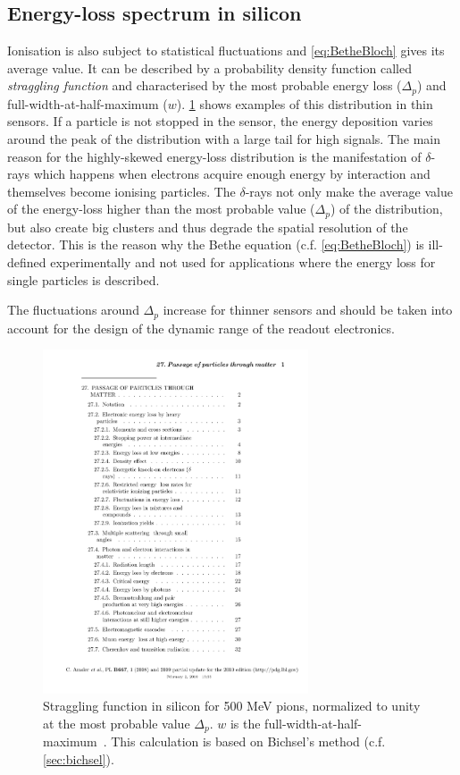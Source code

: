 \subsection{Energy-loss spectrum in silicon}
\label{sec:SiliconEnergyLossSpectrum}
Ionisation is also subject to statistical fluctuations and
\cref{eq:BetheBloch} gives its average value. It can be described by a
probability density function called \textit{straggling function} and
characterised by the most probable energy loss ($\Delta_{p}$) and
full-width-at-half-maximum ($w$). \cref{fig:LandauDistribution} shows
examples of this distribution in thin sensors. If a particle is not
stopped in the sensor, the energy deposition varies around the peak of
the distribution with a large tail for high signals. The main reason
for the highly-skewed energy-loss distribution is the manifestation of
$\delta$-rays which happens when electrons acquire enough energy by
interaction and themselves become ionising particles. The
$\delta$-rays not only make the average value of the energy-loss
higher than the most probable value ($\Delta_{p}$) of the
distribution, but also create big clusters and thus degrade the
spatial resolution of the detector. This is the reason why the Bethe
equation (c.f. \cref{eq:BetheBloch}) is ill-defined experimentally and
not used for applications where the energy loss for single particles
is described.

The fluctuations around $\Delta_{p}$ increase for thinner sensors and
should be taken into account for the design of the dynamic range of
the readout electronics.


\begin{figure}[htbp]
  \centering
  \includegraphics[width=0.7\textwidth, page=14, trim = 50mm 160mm
    40mm 20mm, clip]{Articles/rpp2009-rev-passage-particles-matter.pdf}
  \caption{Straggling function in silicon for 500 MeV pions,
    normalized to unity at the most probable value $\Delta_{p}$. $w$
    is the full-width-at-half-maximum~\cite{Beringer:1900zz}. This
    calculation is based on Bichsel's method
    (c.f. \cref{sec:bichsel}).}
  \label{fig:LandauDistribution}
\end{figure}

